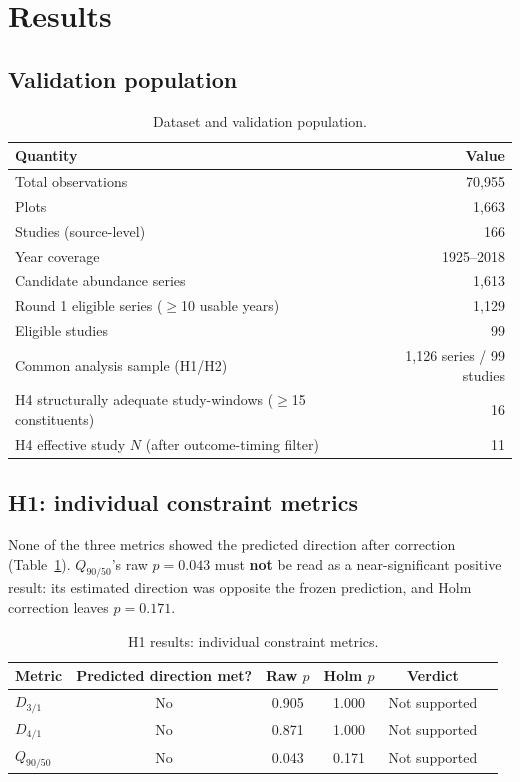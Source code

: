 \documentclass[11pt]{article}
\newcommand{\Dthreeone}{D_{3/1}}
\newcommand{\Dfourone}{D_{4/1}}
\newcommand{\Qninefifty}{Q_{90/50}}
\begin{document}
\section{Results}

\subsection{Validation population}

\begin{table}[h]
\centering
\caption{Dataset and validation population.}
\begin{tabular}{@{}lr@{}}
\toprule
Quantity & Value \\
\midrule
Total observations & 70{,}955 \\
Plots & 1{,}663 \\
Studies (source-level) & 166 \\
Year coverage & 1925--2018 \\
Candidate abundance series & 1{,}613 \\
Round 1 eligible series ($\geq$10 usable years) & 1{,}129 \\
Eligible studies & 99 \\
Common analysis sample (H1/H2) & 1{,}126 series / 99 studies \\
H4 structurally adequate study-windows ($\geq$15 constituents) & 16 \\
H4 effective study $N$ (after outcome-timing filter) & 11 \\
\bottomrule
\end{tabular}
\end{table}

\subsection{H1: individual constraint metrics}

None of the three metrics showed the predicted direction after
correction (Table~\ref{tab:h1}). $\Qninefifty$'s raw $p=0.043$ must
\textbf{not} be read as a near-significant positive result: its estimated
direction was opposite the frozen prediction, and Holm correction leaves
$p=0.171$.

\begin{table}[h]
\centering
\caption{H1 results: individual constraint metrics.}
\label{tab:h1}
\begin{tabular}{@{}lccccc@{}}
\toprule
Metric & Predicted direction met? & Raw $p$ & Holm $p$ & Verdict \\
\midrule
$\Dthreeone$ & No & 0.905 & 1.000 & Not supported \\
$\Dfourone$ & No & 0.871 & 1.000 & Not supported \\
$\Qninefifty$ & No & 0.043 & 0.171 & Not supported \\
\bottomrule
\end{tabular}
\end{table}
\end{document}
